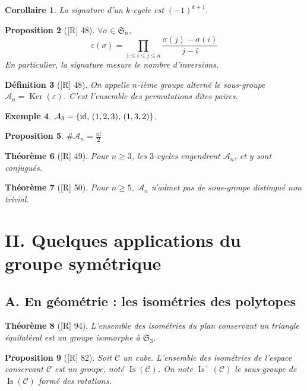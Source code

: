 \documentclass[10pt, a4paper, parskip=full, twoside, twocolumn]{report}
\newtheorem{definition}{Définition}
\newtheorem{theorem}[definition]{Théorème}
\newtheorem{proposition}[definition]{Proposition}
\newtheorem{corollary}[definition]{Corollaire}
\newtheorem{example}[definition]{Exemple}
\DeclareMathOperator{\Is}{Is}
\DeclareMathOperator{\Ker}{Ker}
\begin{document}
\begin{corollary}
	La signature d'un $k$-cycle est $(-1)^{k+1}$.
\end{corollary}

\begin{proposition}[\textnormal{[R] 48}]
	$\forall\sigma\in\mathfrak{S}_n$, 
	$$\varepsilon(\sigma) = \prod_{1\leq i\leq j\leq n}\frac{\sigma(j) - \sigma(i)}{j-i}$$
	En particulier, la signature mesure le nombre d'inversions.
\end{proposition}

\begin{definition}[\textnormal{[R] 48}]
	On appelle \emph{$n$-ième groupe alterné} le sous-groupe $\mathcal{A}_n = \Ker(\varepsilon)$.
	C'est l'ensemble des permutations dîtes \emph{paires}.
\end{definition}

\begin{example}
	$\mathcal{A}_3 = \left\{\textnormal{id},\, (1,2,3),\, (1,3,2)\right\}$.
\end{example}

\begin{proposition}
	$\#\mathcal{A}_n = \frac{n!}{2}$
\end{proposition}

\begin{theorem}[\textnormal{[R] 49}]
	Pour $n\geq 3$, les $3$-cycles engendrent $\mathcal{A}_n$, et y sont conjugués.
\end{theorem}

\begin{theorem}[\textnormal{[R] 50}]
	Pour $n\geq 5$, $\mathcal{A}_n$ n'admet pas de sous-groupe distingué non trivial.
\end{theorem}

\section*{II. Quelques applications du groupe symétrique}
\subsection*{A. En géométrie : les isométries des polytopes}

\begin{theorem}[\textnormal{[R] 94}]
	L'ensemble des isométries du plan conservant un triangle équilatéral est un groupe isomorphe à $\mathfrak{S}_3$.
\end{theorem}

\begin{proposition}[\textnormal{[R] 82}]
	Soit $\mathcal{C}$ un cube. L'ensemble des isométries de l'espace conservant $\mathcal{C}$ est un groupe, noté $\Is(\mathcal{C})$.
	On note $\Is^+(\mathcal{C})$ le sous-groupe de $\Is(\mathcal{C})$ formé des rotations.
\end{proposition}
\end{document}
